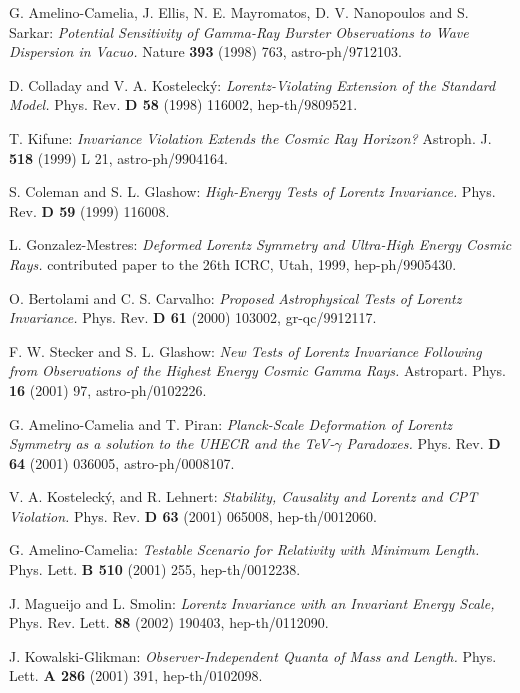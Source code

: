 \documentclass[a4paper,12pt]{article}
\begin{document}
\begin{thebibliography}{999}

 G. Amelino-Camelia, J. Ellis, N. E. Mayromatos, D. V. Nanopoulos and S. Sarkar:
{\it Potential Sensitivity of Gamma-Ray Burster Observations to Wave Dispersion in Vacuo.}
Nature {\bf 393} (1998) 763, astro-ph/9712103.

  D. Colladay and V. A. Kosteleck\'y:
{\it Lorentz-Violating Extension of the Standard Model.}
Phys. Rev. {\bf D 58} (1998) 116002, hep-th/9809521.

 T. Kifune:
{\it Invariance Violation Extends the Cosmic Ray Horizon?}
Astroph. J. {\bf 518} (1999) L 21, astro-ph/9904164.

 S. Coleman and S. L. Glashow:
{\it High-Energy Tests of Lorentz Invariance.}
Phys. Rev. {\bf D 59} (1999) 116008.

 L. Gonzalez-Mestres:
{\it Deformed Lorentz Symmetry and Ultra-High Energy Cosmic Rays.}
contributed paper to the 26th ICRC, Utah, 1999, hep-ph/9905430.

 O. Bertolami and C. S. Carvalho:
{\it Proposed Astrophysical Tests of Lorentz Invariance.}
Phys. Rev. {\bf D 61} (2000) 103002, gr-qc/9912117.

 F. W. Stecker and S. L. Glashow:
{\it New Tests of Lorentz Invariance Following from Observations of the Highest Energy Cosmic Gamma Rays.}
Astropart. Phys. {\bf 16} (2001) 97, astro-ph/0102226.

 G. Amelino-Camelia and T. Piran:
{\it Planck-Scale Deformation of Lorentz Symmetry as a solution to the UHECR and the TeV-$\gamma$ Paradoxes.}
Phys. Rev. {\bf D 64} (2001) 036005, astro-ph/0008107.

 V. A. Kosteleck\'y, and R. Lehnert:
{\it Stability, Causality and Lorentz and CPT Violation.}
Phys. Rev. {\bf D 63} (2001) 065008, hep-th/0012060.

 G. Amelino-Camelia:
{\it Testable Scenario for Relativity with Minimum Length.}
Phys. Lett. {\bf B 510} (2001) 255, hep-th/0012238.

 J. Magueijo and L. Smolin:
{\it Lorentz Invariance with an Invariant Energy Scale,}
Phys. Rev. Lett. {\bf 88} (2002) 190403, hep-th/0112090.

 J. Kowalski-Glikman:
{\it Observer-Independent Quanta of Mass and Length.}
Phys. Lett. {\bf A 286} (2001) 391, hep-th/0102098.


\end{thebibliography}
\end{document}
